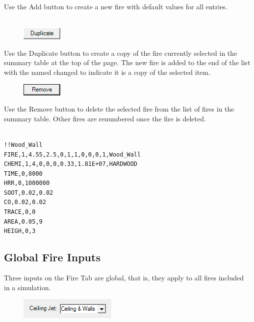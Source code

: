 Use the Add button to create a new fire with default values for all entries. \\~ \\

\begin{figure}
  \includegraphics[width=0.781in]{FIGURES/Input_File/Duplicate_Button}
\end{figure}

Use the Duplicate button to create a copy of the fire currently selected in the summary table at the top of the page. The new fire is added to the end of the list with the named changed to indicate it is a copy of the selected item. \\

\begin{figure}
  \includegraphics[width=0.781in]{FIGURES/Input_File/Remove_Button}
\end{figure}

Use the Remove button to delete the selected fire from the list of fires in the summary table.  Other fires are renumbered once the fire is deleted. \\~ \\

\begin{lstlisting}
!!Wood_Wall
FIRE,1,4.55,2.5,0,1,1,0,0,0,1,Wood_Wall
CHEMI,1,4,0,0,0,0.33,1.81E+07,HARDWOOD
TIME,0,8000
HRR,0,1000000
SOOT,0.02,0.02
CO,0.02,0.02
TRACE,0,0
AREA,0.05,9
HEIGH,0,3
\end{lstlisting}

\subsection{Global Fire Inputs}

Three inputs on the Fire Tab are global, that is, they apply to all fires included in a simulation.

\begin{figure}
  \includegraphics[width=1.865in]{FIGURES/Input_File/Ceiling_Jet}
\end{figure}

